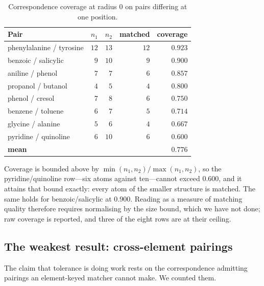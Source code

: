 \documentclass[11pt,twocolumn,a4paper]{article}
\theoremstyle{scthm}
\theoremstyle{definition}
\theoremstyle{remark}
\begin{document}
\begin{table}[htbp]
\centering\small
\caption{Correspondence coverage at radius $0$ on pairs differing at one
position.}
\label{tab:matched}
\begin{tabular}{@{}lrrrr@{}}
\toprule
Pair & $n_1$ & $n_2$ & matched & coverage\\
\midrule
phenylalanine / tyrosine & $12$ & $13$ & $12$ & $0.923$\\
benzoic / salicylic & $9$ & $10$ & $9$ & $0.900$\\
aniline / phenol & $7$ & $7$ & $6$ & $0.857$\\
propanol / butanol & $4$ & $5$ & $4$ & $0.800$\\
phenol / cresol & $7$ & $8$ & $6$ & $0.750$\\
benzene / toluene & $6$ & $7$ & $5$ & $0.714$\\
glycine / alanine & $5$ & $6$ & $4$ & $0.667$\\
pyridine / quinoline & $6$ & $10$ & $6$ & $0.600$\\
\midrule
\textbf{mean} & & & & $\mathbf{0.776}$\\
\bottomrule
\end{tabular}
\end{table}

Coverage is bounded above by $\min(n_1,n_2)/\max(n_1,n_2)$, so the
pyridine/quinoline row---six atoms against ten---cannot exceed $0.600$,
and it attains that bound exactly: every atom of the smaller structure is
matched. The same holds for benzoic/salicylic at $0.900$. Reading
 as a measure of matching quality therefore requires
normalising by the size bound, which we have not done; raw coverage is
reported, and three of the eight rows are at their ceiling.

\subsection{The weakest result: cross-element pairings}

The claim that tolerance is doing work rests on the correspondence
admitting pairings an element-keyed matcher cannot make. We counted them.
\end{document}
